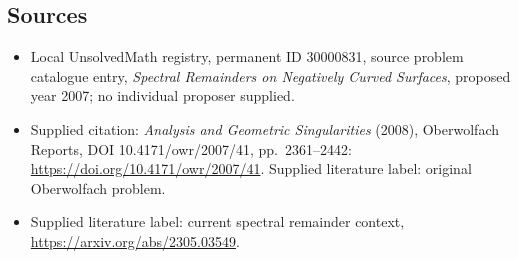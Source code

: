 \documentclass[11pt]{article}
\begin{document}
\subsection{Sources}
\begin{itemize}\item Local UnsolvedMath registry, permanent ID 30000831, source problem catalogue entry, \emph{Spectral Remainders on Negatively Curved Surfaces}, proposed year 2007; no individual proposer supplied.\item Supplied citation: \emph{Analysis and Geometric Singularities} (2008), Oberwolfach Reports, DOI 10.4171/owr/2007/41, pp.\ 2361--2442: \url{https://doi.org/10.4171/owr/2007/41}. Supplied literature label: original Oberwolfach problem.\item Supplied literature label: current spectral remainder context, \url{https://arxiv.org/abs/2305.03549}.\end{itemize}
\end{document}
